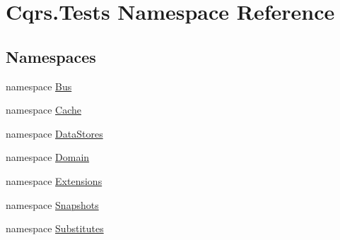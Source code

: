 \hypertarget{namespaceCqrs_1_1Tests}{}\section{Cqrs.\+Tests Namespace Reference}
\label{namespaceCqrs_1_1Tests}
\subsection*{Namespaces}
\begin{DoxyCompactItemize}
\item 
namespace \hyperlink{namespaceCqrs_1_1Tests_1_1Bus}{Bus}
\item 
namespace \hyperlink{namespaceCqrs_1_1Tests_1_1Cache}{Cache}
\item 
namespace \hyperlink{namespaceCqrs_1_1Tests_1_1DataStores}{Data\+Stores}
\item 
namespace \hyperlink{namespaceCqrs_1_1Tests_1_1Domain}{Domain}
\item 
namespace \hyperlink{namespaceCqrs_1_1Tests_1_1Extensions}{Extensions}
\item 
namespace \hyperlink{namespaceCqrs_1_1Tests_1_1Snapshots}{Snapshots}
\item 
namespace \hyperlink{namespaceCqrs_1_1Tests_1_1Substitutes}{Substitutes}
\end{DoxyCompactItemize}
